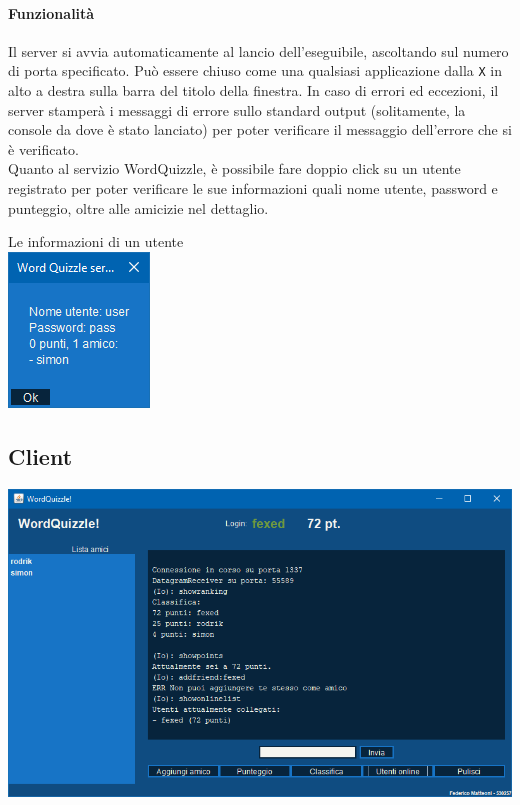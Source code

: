 \documentclass[10pt]{article}
\begin{document}
{\paragraph{Funzionalità} Il server si avvia automaticamente al lancio dell'eseguibile, ascoltando sul numero di porta specificato. Può essere chiuso come una qualsiasi applicazione dalla \texttt{X} in alto a destra sulla barra del titolo della finestra. In caso di errori ed eccezioni, il server stamperà i messaggi di errore sullo standard output (solitamente, la console da dove è stato lanciato) per poter verificare il messaggio dell'errore che si è verificato.\\
Quanto al servizio WordQuizzle, è possibile fare doppio click su un utente registrato per poter verificare le sue informazioni quali nome utente, password e punteggio, oltre alle amicizie nel dettaglio.
\begin{center}
Le informazioni di un utente\\
\includegraphics[scale=1]{infouser.png}
\end{center}
\pagebreak
\subsection{Client}
\begin{center}
\includegraphics[scale=0.75]{client.png}
\end{center}
}
\end{document}
